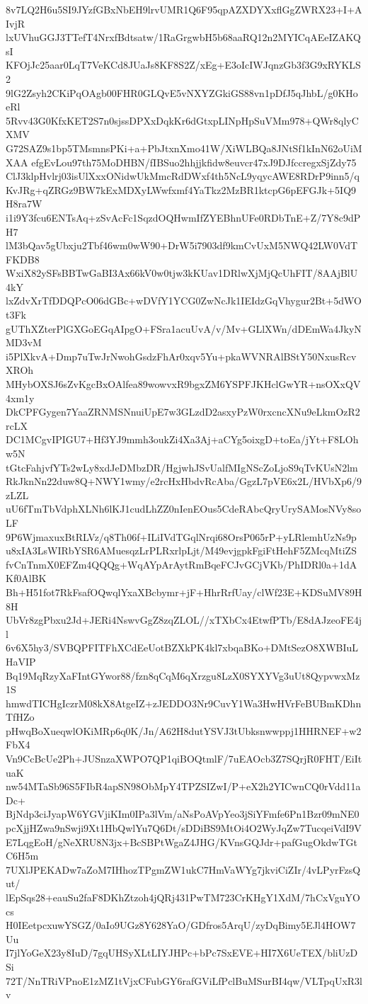 8v7LQ2H6u5SI9JYzfGBxNbEH9lrvUMR1Q6F95qpAZXDYXxflGgZWRX23+I+AIvjR
lxUVhuGGJ3TTefT4NrxfBdtsatw/1RaGrgwbH5b68aaRQ12n2MYICqAEeIZAKQsI
KFOjJc25aar0LqT7VeKCd8JUaJs8KF8S2Z/xEg+E3oIcIWJqnzGb3f3G9xRYKLS2
9lG2Zsyh2CKiPqOAgb00FHR0GLQvE5vNXYZGkiGS88vn1pDfJ5qJhbL/g0KHoeRl
5Rvv43G0KfxKET2S7n0sjssDPXxDqkKr6dGtxpLINpHpSuVMm978+QWr8qlyCXMV
G72SAZ9s1bp5TMsmnsPKi+a+PbJtxnXmo41W/XiWLBQa8JNtSf1kInN62oUiMXAA
efgEvLou97th75MoDHBN/fIBSuo2hhjjkfidw8euvcr47xJ9DJfccregxSjZdy75
ClJ3klpHvlrj03isUlXxxONidwUkMmcRdDWxf4th5NcL9yqycAWE8RDrP9inn5/q
KvJRg+qZRGz9BW7kExMDXyLWwfxmf4YaTkz2MzBR1ktcpG6pEFGJk+5IQ9H8ra7W
i1i9Y3fcu6ENTsAq+zSvAcFc1SqzdOQHwmIfZYEBhnUFe0RDbTnE+Z/7Y8c9dPH7
lM3bQav5gUbxju2Tbf46wm0wW90+DrW5i7903df9kmCvUxM5NWQ42LW0VdTFKDB8
WxiX82ySFsBBTwGaBI3Ax66kV0w0tjw3kKUav1DRlwXjMjQcUhFIT/8AAjBlU4kY
lxZdvXrTfDDQPcO06dGBc+wDVfY1YCG0ZwNcJk1IEIdzGqVhygur2Bt+5dWOt3Fk
gUThXZterPlGXGoEGqAIpgO+FSra1acuUvA/v/Mv+GLlXWn/dDEmWa4JkyNMD3vM
i5PlXkvA+Dmp7uTwJrNwohGsdzFhAr0xqv5Yu+pkaWVNRAlBStY50NxusRcvXROh
MHybOXSJ6sZvKgcBxOAlfea89wowvxR9bgxZM6YSPFJKHclGwYR+nsOXxQV4xm1y
DkCPFGygen7YaaZRNMSNnuiUpE7w3GLzdD2asxyPzW0rxcncXNu9eLkmOzR2rcLX
DC1MCgvIPIGU7+Hf3YJ9mmh3oukZi4Xa3Aj+aCYg5oixgD+toEa/jYt+F8LOhw5N
tGtcFahjvfYTs2wLy8xdJeDMbzDR/HgjwhJSvUalfMIgNScZoLjoS9qTvKUsN2lm
RkJknNn22duw8Q+NWY1wmy/e2rcHxHbdvRcAba/GgzL7pVE6x2L/HVbXp6/9zLZL
uU6fTmTbVdphXLNh6lKJ1cudLhZZ0nIenEOus5CdeRAbcQryUrySAMosNVy8soLF
9P6WjmaxuxBtRLVz/q8Th06f+ILiIVdTGqlNrqi68OrsP065rP+yLRlemhUzNs9p
u8xIA3LsWIRbYSR6AMuesqzLrPLRxrlpLjt/M49evjgpkFgiFtHehF5ZMcqMtiZS
fvCnTnmX0EFZm4QQQg+WqAYpArAytRmBqeFCJvGCjVKb/PhIDRl0a+1dAKf0AlBK
Bh+H51fot7RkFsafOQwqlYxaXBcbymr+jF+HhrRrfUay/clWf23E+KDSuMV89H8H
UbVr8zgPbxu2Jd+JERi4NswvGgZ8zqZLOL//xTXbCx4EtwfPTb/E8dAJzeoFE4jl
6v6X5hy3/SVBQPFITFhXCdEeUotBZXkPK4kl7xbqaBKo+DMtSezO8XWBIuLHaVIP
Bq19MqRzyXaFIntGYwor88/fzn8qCqM6qXrzgu8LzX0SYXYVg3uUt8QypvwxMz1S
hmwdTICHgIczrM08kX8AtgeIZ+zJEDDO3Nr9CuvY1Wa3HwHVrFeBUBmKDhnTfHZo
pHwqBoXueqwlOKiMRp6q0K/Jn/A62H8dutYSVJ3tUbksnwwppj1HHRNEF+w2FbX4
Vn9CcBcUe2Ph+JUSnzaXWPO7QP1qiBOQtmlF/7uEAOcb3Z7SQrjR0FHT/EiItuaK
nw54MTaSb96S5FIbR4apSN98ObMpY4TPZSIZwI/P+eX2h2YICwnCQ0rVdd11aDc+
BjNdp3ciJyapW6YGVjiKIm0IPa3lVm/aNsPoAVpYeo3jSiYFmfe6Pn1Bzr09mNE0
pcXjjHZwa9nSwji9Xt1HbQwlYu7Q6Dt/sDDiBS9MtOi4O2WyJqZw7TucqeiVdI9V
E7LqgEoH/gNeXRU8N3jx+BcSBPtWgaZ4JHG/KVnsGQJdr+pafGugOkdwTGtC6H5m
7UXlJPEKADw7aZoM7IHhozTPgmZW1ukC7HmVaWYg7jkviCiZIr/4vLPyrFzsQut/
lEpSqs28+eauSu2faF8DKhZtzoh4jQRj431PwTM723CrKHgY1XdM/7hCxVguYOcs
H0IEetpcxuwYSGZ/0aIo9UGz8Y628YaO/GDfros5ArqU/zyDqBimy5EJl4HOW7Uu
I7jlYoGeX23y8IuD/7gqUHSyXLtLIYJHPc+bPc7SxEVE+HI7X6UeTEX/bliUzDSi
72T/NnTRiVPnoE1zMZ1tVjxCFubGY6rafGViLfPclBuMSurBI4qw/VLTpqUxR3lv
